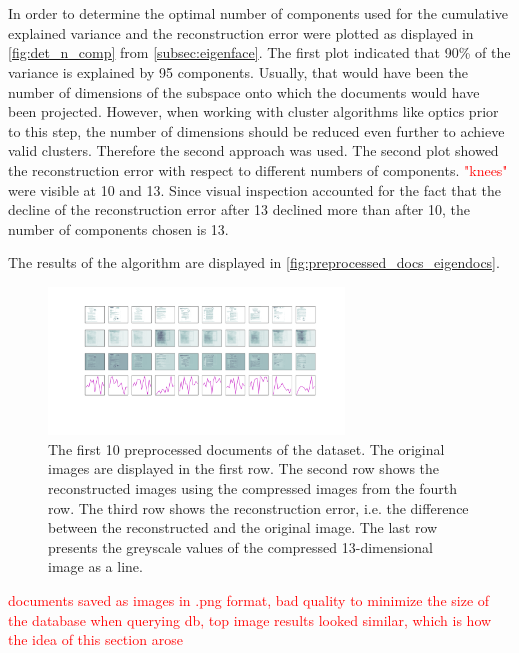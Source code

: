 \section{\eigendocs{}}\label{sec:evaluation-eigendocs}
In order to determine the optimal number of components used for \eigendocs{} the cumulative explained variance and the reconstruction error were plotted 
as displayed in \autoref{fig:det_n_comp} from \autoref{subsec:eigenface}.
The first plot indicated that 90\% of the variance is explained by 95 components.
Usually, that would have been the number of dimensions of the subspace onto which the documents would have been projected.
However, when working with cluster algorithms like \ac{optics} prior to this step, the number of dimensions should be reduced even further to achieve valid clusters.
Therefore the second approach was used.
The second plot showed the reconstruction error with respect to different numbers of components.
\textcolor{red}{"knees"} were visible at 10 and 13.
Since visual inspection accounted for the fact that the decline of the reconstruction error after 13 declined more than after 10, the number of components chosen is 13.

The results of the \eigendocs{} algorithm are displayed in \autoref{fig:preprocessed_docs_eigendocs}.

\begin{figure}[htp] %
    \centering
    \includegraphics[width=0.7\textwidth]{images/Eigendocs/transformation/eigendocs_13dims.pdf}
    \caption{The first 10 preprocessed documents of the dataset.
    The original images are displayed in the first row.
    The second row shows the reconstructed images using the compressed images from the fourth row.
    The third row shows the reconstruction error, i.e. the difference between the reconstructed and the original image.
    The last row presents the greyscale values of the compressed 13-dimensional image as a line.
    }
    \label{fig:preprocessed_docs_eigendocs}
\end{figure}


\textcolor{red}{documents saved as images in .png format, bad quality to minimize the size of the database
when querying db, top image results looked similar, which is how the idea of this section arose}